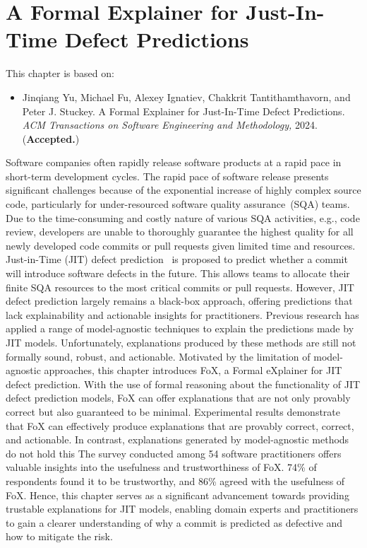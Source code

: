 \chapter{A Formal Explainer for Just-In-Time Defect Predictions}\label{chap:jit}

This chapter is based on:
\begin{itemize}
	\item Jinqiang Yu, Michael Fu, Alexey Ignatiev, Chakkrit Tantithamthavorn, and Peter J. Stuckey. A
Formal Explainer for Just-In-Time Defect Predictions. \emph{ACM Transactions on Software Engineering
	and Methodology,} 2024. (\textbf{Accepted.})
\end{itemize}

Software companies often rapidly release software products at a rapid pace in short-term development
cycles.
%
The rapid pace of software release presents significant challenges
because of the exponential increase of highly complex source code, particularly for 
under-resourced software quality assurance~(SQA) teams.
%
Due to the time-consuming and costly nature of various SQA activities, 
e.g., code review, developers are unable to thoroughly guarantee the highest quality for 
all newly developed code commits or pull requests given limited time and resources.
%
Just-in-Time (JIT) defect prediction~\cite{kim2007predicting,Kamei2013,pornprasit2021jitline,lin2021impact} is 
proposed to predict whether a commit will introduce software defects in the future. 
%
This allows teams to allocate their finite SQA resources to the most critical 
commits or pull requests. 
%
However, JIT defect prediction largely remains a black-box approach, 
offering predictions that lack explainability and actionable insights for practitioners.
%
Previous research has applied a range of model-agnostic techniques to explain the predictions made
by JIT models.
%
Unfortunately, explanations produced by these methods are still not formally sound, robust, and
actionable.
%
Motivated by the limitation of model-agnostic approaches, this chapter introduces FoX, 
a Formal eXplainer for JIT defect prediction.
%
With the use of formal reasoning about the functionality of JIT defect prediction models,
FoX can offer explanations that are not only provably correct but also guaranteed to be 
minimal.
%
Experimental results demonstrate that FoX can effectively produce explanations that are provably correct, correct,
and actionable. 
%
In contrast, explanations generated by model-agnostic methods do not hold this
%
The survey conducted among 54 software practitioners offers valuable insights 
into the usefulness and trustworthiness of FoX.
%
74\% of respondents found it to be trustworthy,
and 86\% agreed with the usefulness of FoX.
%
Hence, this chapter serves as a significant advancement towards providing trustable explanations for
JIT models, enabling domain experts and practitioners to gain a clearer understanding of
why a commit is predicted as defective and how to mitigate the risk.



